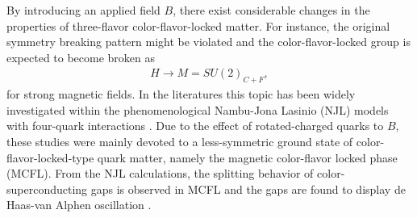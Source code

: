 \documentclass[12pt]{article}
\begin{document}
By introducing an applied field $B$, there exist considerable changes in the properties of three-flavor color-flavor-locked matter. 
For instance, the original symmetry breaking pattern might be violated and the color-flavor-locked group is expected to become broken as
\begin{eqnarray}
H\rightarrow M=SU(2)_{C+F},\label{cfl2}\end{eqnarray}
for strong magnetic fields.
In the literatures this topic has been widely investigated within the phenomenological Nambu-Jona Lasinio (NJL)
models with four-quark interactions \cite{ferrer2005magnetic,fukushima2008color,ferrer2006color,ferrer2007magnetic,sen2015anisotropic}. Due to the effect of rotated-charged quarks to $B$, these studies were mainly devoted to a less-symmetric ground state of color-flavor-locked-type quark matter, namely the magnetic color-flavor locked phase
(MCFL). 
From the NJL calculations, the splitting behavior of color-superconducting gaps is observed in MCFL and the gaps are found to display de Haas-van Alphen
oscillation \cite{ferrer2005magnetic,fukushima2008color}.      
\end{document}
